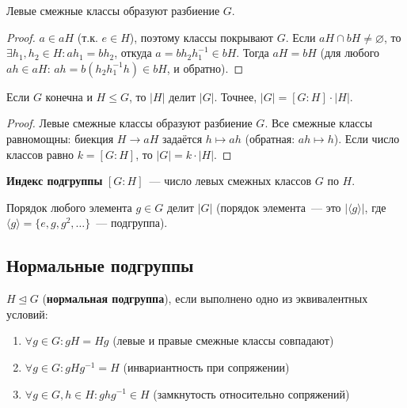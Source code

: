 \documentclass[12pt]{article}
\begin{document}
	\begin{lemma}
		Левые смежные классы образуют разбиение $G$.
	\end{lemma}
	
	\begin{proof}
		$a \in aH$ (т.к. $e \in H$), поэтому классы покрывают $G$. Если $aH \cap bH \neq \varnothing$, то $\exists h_1, h_2 \in H: ah_1 = bh_2$, откуда $a = bh_2 h_1^{-1} \in bH$. Тогда $aH = bH$ (для любого $ah \in aH$: $ah = b(h_2 h_1^{-1} h) \in bH$, и обратно).
	\end{proof}
	
	\begin{theorem}[Лагранж]
		Если $G$ конечна и $H \leqslant G$, то $|H|$ делит $|G|$. Точнее, $|G| = [G : H] \cdot |H|$.
	\end{theorem}
	
	\begin{proof}
		Левые смежные классы образуют разбиение $G$. Все смежные классы равномощны: биекция $H \to aH$ задаётся $h \mapsto ah$ (обратная: $ah \mapsto h$). Если число классов равно $k = [G : H]$, то $|G| = k \cdot |H|$.
	\end{proof}
	
	\begin{definition}
		\textbf{Индекс подгруппы} $[G : H]$~--- число левых смежных классов $G$ по $H$.
	\end{definition}
	
	\begin{corollary}
		Порядок любого элемента $g \in G$ делит $|G|$ (порядок элемента~--- это $|\langle g \rangle|$, где $\langle g \rangle = \{e, g, g^2, \dots\}$~--- подгруппа).
	\end{corollary}
	
	\subsection{Нормальные подгруппы}
	
	\begin{definition}
		$H \trianglelefteq G$ (\textbf{нормальная подгруппа}), если выполнено одно из эквивалентных условий:
		\begin{enumerate}
			\item $\forall g \in G: gH = Hg$ (левые и правые смежные классы совпадают)
			\item $\forall g \in G: gHg^{-1} = H$ (инвариантность при сопряжении)
			\item $\forall g \in G, h \in H: ghg^{-1} \in H$ (замкнутость относительно сопряжений)
		\end{enumerate}
	\end{definition}
	
\end{document}
